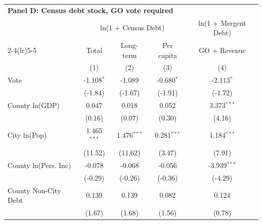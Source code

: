 \begingroup
\centering
\begin{tabular*}{\textwidth}{@{\extracolsep{\fill}}lcccc}
\multicolumn{5}{l}{\textbf{Panel D: Census debt stock, GO vote required}}\\

\addlinespace
   \toprule
                        & \multicolumn{3}{c}{ln(1 + Census Debt)} & \multicolumn{1}{c}{ln(1 + Mergent Debt)}\\  
   \cmidrule(lr){2-4}\cmidrule(lr){5-5}
                        & Total                     & Long-term                     & Per capita                           & GO + Revenue \\   
                        & (1)                       & (2)                           & (3)                                  & (4)\\  
   \midrule 
   Vote                 & -1.108$^{*}$              & -1.089                        & -0.680$^{*}$                         & -2.113$^{*}$\\   
                        & (-1.84)                  & (-1.67)                      & (-1.91)                             & (-1.72)\\   
   County ln(GDP)       & 0.047                     & 0.018                         & 0.052                                & 3.373$^{***}$\\   
                        & (0.16)                   & (0.07)                       & (0.30)                              & (4.16)\\   
   City ln(Pop)         & 1.465$^{***}$             & 1.476$^{***}$                 & 0.281$^{***}$                        & 1.184$^{***}$\\   
                        & (11.52)                  & (11.62)                      & (3.47)                              & (7.91)\\   
   County ln(Pers. Inc) & -0.078                    & -0.068                        & -0.056                               & -3.939$^{***}$\\   
                        & (-0.29)                  & (-0.26)                      & (-0.36)                             & (-4.29)\\   
   County Non-City Debt & 0.139                     & 0.139                         & 0.082                                & 0.124\\   
                        & (1.67)                   & (1.68)                       & (1.56)                              & (0.78)\\   

\end{tabular*}
